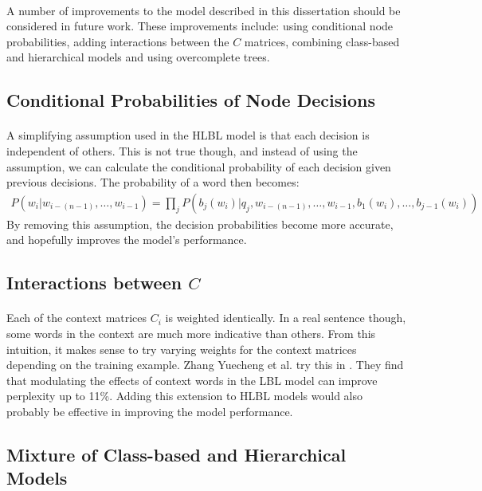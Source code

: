 \paragraph{}
A number of improvements to the model described in this dissertation should be considered in future work.
These improvements include: using conditional node probabilities, adding interactions between the $C$ matrices, combining class-based and hierarchical models and using overcomplete trees.
 
\subsection{Conditional Probabilities of Node Decisions}
\paragraph{}
A simplifying assumption used in the HLBL model is that each decision is independent of others. This is not true though, and instead of using the assumption, we can calculate the conditional probability of each decision given previous decisions. The probability of a word then becomes:
\begin{align}
P(w_i | w_{i-(n-1)},\dots, w_{i-1})  = \prod_j P(b_j(w_i) | q_j, w_{i-(n-1)},\dots, w_{i-1}, b_1(w_i), \dots, b_{j-1}(w_i))
\end{align}
By removing this assumption, the decision probabilities become more accurate, and hopefully improves the model's performance.

\subsection{Interactions between $C$}
\paragraph{}
Each of the context matrices $C_i$ is weighted identically. In a real sentence though, some words in the context are much more indicative than others. From this intuition, it makes sense to try varying weights for the context matrices depending on the training example. Zhang Yuecheng et al. try this in \cite{Yuecheng2008}. They find that modulating the effects of context words in the LBL model can improve perplexity up to 11\%. Adding this extension to HLBL models would also probably be effective in improving the model performance.

\subsection{Mixture of Class-based and Hierarchical Models}
